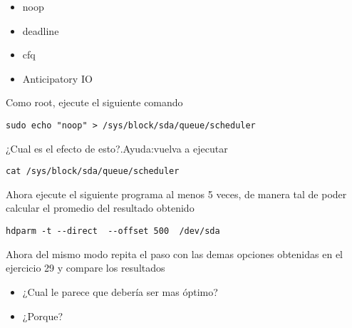 \begin{questions}
\begin{itemize}
	\item noop
	\item deadline
	\item cfq
        \item Anticipatory IO
\end{itemize}
\question Como root, ejecute el siguiente comando
\begin{verbatim}
sudo echo "noop" > /sys/block/sda/queue/scheduler
\end{verbatim}
¿Cual es el efecto de esto?.Ayuda:vuelva a ejecutar
\begin{verbatim}
cat /sys/block/sda/queue/scheduler
\end{verbatim}
\question Ahora ejecute el siguiente programa al menos 5 veces, de manera tal de poder calcular el promedio del resultado obtenido
\begin{verbatim}
hdparm -t --direct  --offset 500  /dev/sda
\end{verbatim}
\question Ahora del mismo modo repita el paso con las demas opciones obtenidas en el ejercicio 29 y compare los resultados
\begin{itemize}
	\item ¿Cual le parece que debería ser mas óptimo?
        \item ¿Porque?
\end{itemize}
\end{questions}

